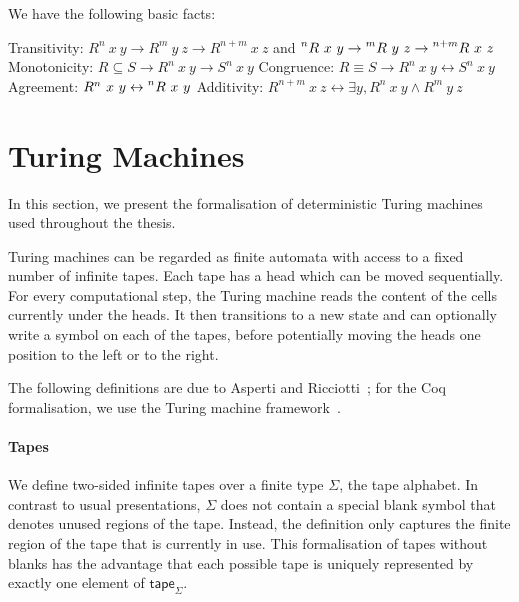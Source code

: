 \begin{proposition}\label{prop:relpower}
  We have the following basic facts:
  \begin{enumerate}
     Transitivity: $R^n~x~y \rightarrow R^m~y~z \rightarrow R^{n+m}~x~z$ and $\prescript{n}{}R~x~y \rightarrow \prescript{m}{}R~y~z \rightarrow \prescript{n+m}{}R~x~z$
     Monotonicity: $R \subseteq S \rightarrow R^n~x~y \rightarrow S^n~x~y$
     Congruence: $R \equiv S \rightarrow R^n~x~y \leftrightarrow S^n~x~y$
     Agreement: $R^n~x~y \leftrightarrow \prescript{n}{}R~x~y$
     Additivity: $R^{n+m}~x~z \leftrightarrow \exists y, R^n~x~y \land R^m~y~z$
  \end{enumerate}
\end{proposition}

\section{Turing Machines}\label{sec:tm}
In this section, we present the formalisation of deterministic Turing machines used throughout the thesis. 

Turing machines can be regarded as finite automata with access to a fixed number of infinite tapes. Each tape has a head which can be moved sequentially. 
For every computational step, the Turing machine reads the content of the cells currently under the heads. It then transitions to a new state and can optionally write a symbol on each of the tapes, before potentially moving the heads one position to the left or to the right.

The following definitions are due to Asperti and Ricciotti~\cite{asperti_ricciotti}; for the Coq formalisation, we use the Turing machine framework~\cite{ForsterEtAl:2019:VerifiedTMs}.

\paragraph{Tapes}
We define two-sided infinite tapes over a finite type $\Sigma$, the tape alphabet. In contrast to usual presentations, $\Sigma$ does not contain a special blank symbol that denotes unused regions of the tape. Instead, the definition only captures the finite region of the tape that is currently in use. 
This formalisation of tapes without blanks has the advantage that each possible tape is uniquely represented by exactly one element of $\textsf{tape}_\Sigma$. 

